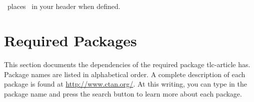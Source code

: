 \documentclass[12pt]{tlc-article}
\begin{document}

\subsection{\tlcLG}
\tlcA\ places \tlcLG\ in your header when defined.


\clearpage
\section{Required Packages}
This section documents the dependencies of the required package tlc-article has.
Package names are listed in alphabetical order. A complete description of each
package is found at \url{http://www.ctan.org/}. At this writing, you can type in
the package name and press the search button to learn more about each package.

\csvreader[tlcPkgStyle, separator=pipe]{\tlcPkgFile}{}{\name & \description}

\end{document}
